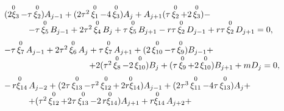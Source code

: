 \begin{equation}

\begin{array}{l}

(\mathop{2\xi_3}\limits^{0}-\tau\mathop{\xi_2}\limits^{0})A_{j-1}+

(2\tau^2\mathop{\xi_1}\limits^{0}-4\mathop{\xi_3}\limits^{0})A_{j}+

A_{j+1}(\tau\mathop{\xi_2}\limits^{0}+2\mathop{\xi_3}\limits^{0})- 

\\ 

\hspace{1cm}

-\tau\mathop{\xi_5}\limits^{0}B_{j-1}+2\tau^2\mathop{\xi_4}\limits^{0}B_j+\tau\mathop{\xi_5}\limits^{0}B_{j+1}-r\tau\mathop{\xi_2}\limits^{0}D_{j-1}+r\tau\mathop{\xi_2}\limits^{0}D_{j+1}=0,  

\\[2mm]

-\tau\mathop{\xi_7}\limits^{0}A_{j-1}+2\tau^2\mathop{\xi_6}\limits^{0}A_j+

\tau\mathop{\xi_7}\limits^{0}A_{j+1}+(2\mathop{\xi_{10}}\limits^{0}-\tau\mathop{\xi_9}\limits^{0})B_{j-1}+

\\  

\hspace{3.5cm}

+ 2(\tau^2\mathop{\xi_8}\limits^{0}-2\mathop{\xi_{10}}\limits^{0})B_j

+(\tau\mathop{\xi_9}\limits^{0}+2\mathop{\xi_{10}}\limits^{0})B_{j+1}+m   D_j=0, 

\\[2mm] 

-\mathop{r\xi_{14}}\limits^{0}A_{j-2}+

(2\tau\mathop{\xi_{13}}\limits^{0}-\tau^2\mathop{\xi_{12}}\limits^{0}+\mathop{2r\xi_{14}}\limits^{0})A_{j-1}+

(2\tau^3\mathop{\xi_{11}}\limits^{0}-4\tau\mathop{\xi_{13}}\limits^{0})A_j+ 

\\

\hspace{1cm}

+(\tau^2\mathop{\xi_{12}}\limits^{0}+2\tau\mathop{\xi_{13}}\limits^{0}-2\mathop{r\xi_{14}}\limits^{0})A_{j+1}+

\mathop{r\xi_{14}}\limits^{0}A_{j+2}+

\\


\end{array}
\end{equation}
